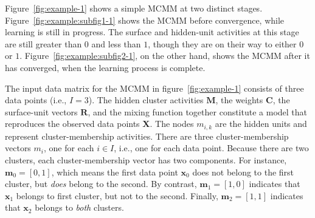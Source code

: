 {Figure~\ref{fig:example-1} shows a simple MCMM at two distinct stages. Figure~\ref{fig:example:subfig1-1} shows the MCMM before convergence, while learning is still in progress. The surface and hidden-unit activities at this stage are still greater than $0$ and less than $1$, though they are on their way to either $0$ or $1$. Figure~\ref{fig:example:subfig2-1}, on the other hand, shows the MCMM after it has converged, when the learning process is complete.

The input data matrix for the MCMM in figure~\ref{fig:example-1} consists of three data points (i.e., $I = 3$).
The hidden cluster activities $\mathbf{M}$, the weights $\mathbf{C}$, the surface-unit vectors $\mathbf{R}$,
and the mixing function together constitute a model that reproduces the
observed data points $\mathbf{X}$.
The nodes $m_{i,k}$ are the hidden units and represent cluster-membership activities. There are three cluster-membership vectors $m_{i}$, one for each $i \in I$, i.e., one for each data point. Because there are two clusters, each cluster-membership vector has two components. For instance, $\textbf{m}_{0} = [0, 1]$, which means the first data point $\textbf{x}_{0}$ does not belong to the first cluster, but \emph{does} belong to the second. By contrast, $\textbf{m}_{1} = [1,0]$ indicates that $\textbf{x}_{1}$ belongs to first cluster, but not to the second. Finally, $\textbf{m}_{2} = [1,1]$ indicates that  $\textbf{x}_{2}$ belongs to \emph{both} clusters. 

 \begin{figure}[t]
 \begin{center}
\end{center}
\end{figure}}
